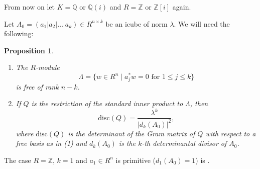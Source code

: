 \documentclass[11pt]{amsart}
\newcommand{\disc}{\mathrm{disc}}
\newtheorem{proposition}{Proposition}[section]
\theoremstyle{definition}
\theoremstyle{remark}
\begin{document}
From now on let $K=\mathbb Q$ or $\mathbb Q(i)$ and $R=\mathbb Z$ or $\mathbb Z[i]$ again.

Let $A_0=(a_1|a_2|\dots|a_k)\in R^{n\times k}$ be an icube of norm $\lambda$. We will need the following:


\begin{proposition}\label{discQlemma}~
\begin{enumerate}
\item The $R$-module
\[\Lambda=\{w\in R^n \mid a_j^*w=0\text{ for }1\leq j\leq k\}\]
is free of rank $n-k$.
\item If $Q$ is the restriction of the standard inner product to $\Lambda$, then
\[\disc(Q)=\frac{\lambda^k}{|d_k(A_0)|^2},\]
where $\disc(Q)$ is the determinant of the Gram matrix of $Q$ with respect to a free basis as in (1) and $d_k(A_0)$ is the $k$-th determinantal divisor of $A_0$.
\end{enumerate}
\end{proposition}

The case $R=\mathbb Z$, $k=1$ and $a_1\in R^n$ is primitive ($d_1(A_0)=1$) is \cite[Proposition~2]{Horvath}.
\end{document}
